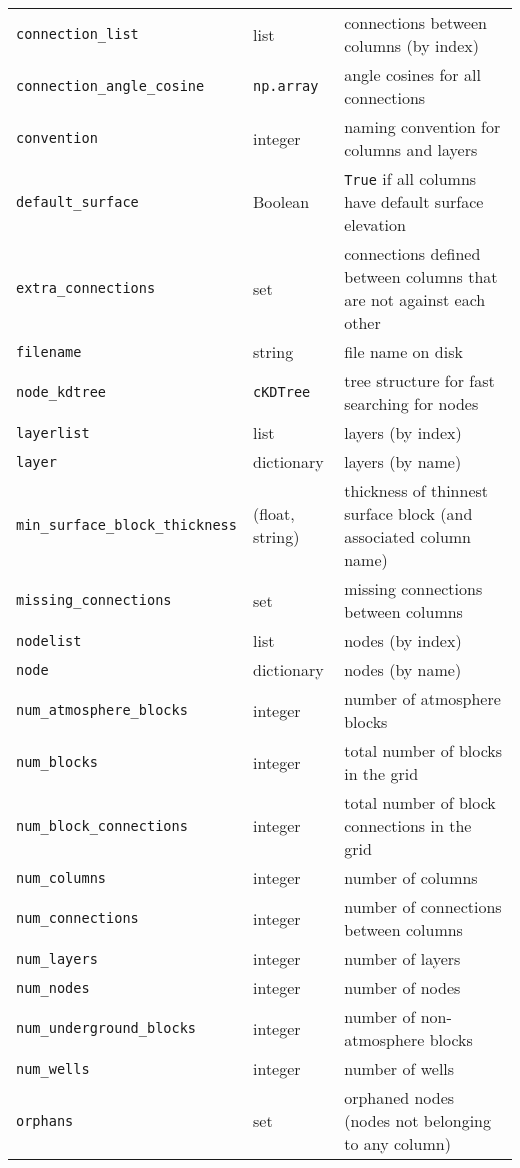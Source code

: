 \begin{center}
\begin{longtable}{|l|l|p{75mm}|}
    \texttt{connection\_list} & list & connections between columns (by index)\\
    \texttt{connection\_angle\_cosine} & \texttt{np.array} & angle cosines for all connections\\
    \texttt{convention} & integer & naming convention for columns and layers\\
    \texttt{default\_surface} & Boolean  & \texttt{True} if all columns have default surface elevation\\
    \texttt{extra\_connections} & set & connections defined between columns that are not against each other\\
    \texttt{filename} & string  & file name on disk\\
    \texttt{node\_kdtree} & \texttt{cKDTree} & tree structure for fast searching for nodes \\
    \texttt{layerlist} & list & layers (by index)\\
    \texttt{layer} & dictionary & layers (by name)\\
    \texttt{min\_surface\_block\_thickness} & (float, string) & thickness of thinnest surface block (and associated column name)\\
    \texttt{missing\_connections} & set & missing connections between columns\\
    \texttt{nodelist} & list  & nodes (by index)\\
    \texttt{node} & dictionary  & nodes (by name)\\
    \texttt{num\_atmosphere\_blocks} & integer & number of atmosphere blocks\\
    \texttt{num\_blocks} & integer & total number of blocks in the grid\\
    \texttt{num\_block\_connections} & integer & total number of block connections in the grid\\
    \texttt{num\_columns} & integer & number of columns\\
    \texttt{num\_connections} & integer & number of connections between columns\\
    \texttt{num\_layers} & integer & number of layers\\
    \texttt{num\_nodes} & integer & number of nodes\\
    \texttt{num\_underground\_blocks} & integer & number of non-atmosphere blocks\\
    \texttt{num\_wells} & integer & number of wells\\
    \texttt{orphans} & set & orphaned nodes (nodes not belonging to any column)\\

\end{longtable}
\end{center}
